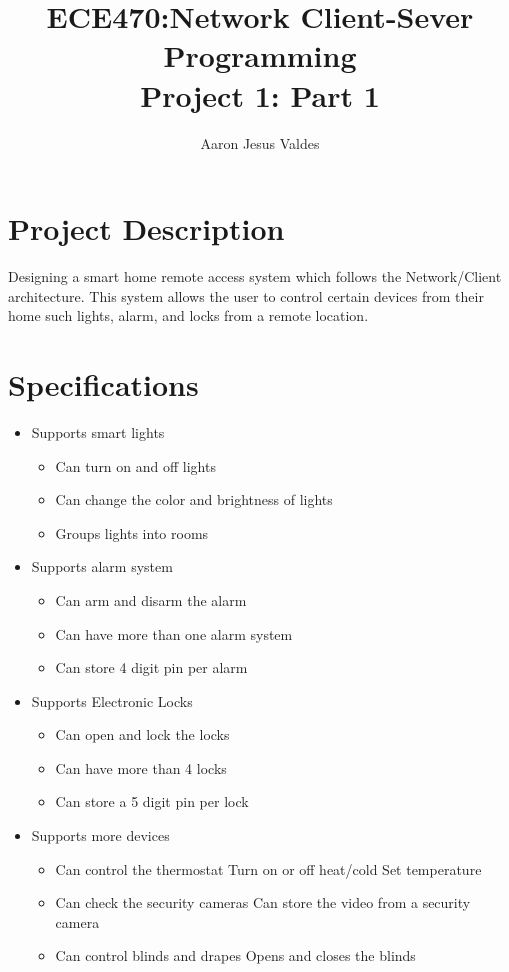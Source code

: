\documentclass[11pt]{article}
\title{\Huge{ECE470:Network Client-Sever Programming}\\\LARGE{Project 1: Part 1}}
\author{Aaron Jesus Valdes}
\begin{document}
	\maketitle
	\clearpage
	\tableofcontents
	\onehalfspacing
	\clearpage
	\section{Project Description}
	Designing a smart home remote access system which follows the Network/Client architecture. This system allows the user to control certain devices from their home such lights, alarm, and locks from a remote location.
	\section{Specifications}
		\begin{itemize}
			\item Supports smart lights
				\begin{itemize}
					\item Can turn on and off lights
					\item Can change the color and brightness of lights
					\item Groups lights into rooms
				\end{itemize}
			\item Supports alarm system
				\begin{itemize}
					\item Can arm and disarm the alarm
					\item Can have more than one alarm system
					\item Can store 4 digit pin per alarm 
				\end{itemize}
			\item Supports Electronic Locks
				\begin{itemize}
					\item Can open and lock the locks
					\item Can have more than 4 locks
					\item Can store a 5 digit pin per lock
				\end{itemize}
			\item Supports more devices
				\begin{itemize}
					\item Can control the thermostat
						\subitem Turn on or off heat/cold
						\subitem Set temperature
					\item Can check the security cameras
						\subitem Can store the video from a security camera
					\item Can control blinds and drapes
						\subitem Opens and closes the blinds
				\end{itemize}
		\end{itemize}
\end{document}
